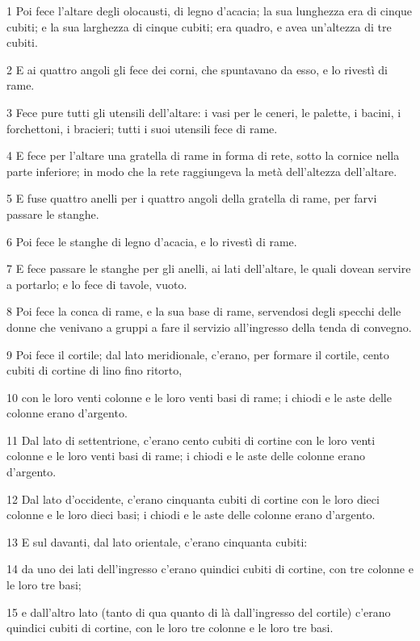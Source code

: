 \par 1 Poi fece l'altare degli olocausti, di legno d'acacia; la sua lunghezza era di cinque cubiti; e la sua larghezza di cinque cubiti; era quadro, e avea un'altezza di tre cubiti.
\par 2 E ai quattro angoli gli fece dei corni, che spuntavano da esso, e lo rivestì di rame.
\par 3 Fece pure tutti gli utensili dell'altare: i vasi per le ceneri, le palette, i bacini, i forchettoni, i bracieri; tutti i suoi utensili fece di rame.
\par 4 E fece per l'altare una gratella di rame in forma di rete, sotto la cornice nella parte inferiore; in modo che la rete raggiungeva la metà dell'altezza dell'altare.
\par 5 E fuse quattro anelli per i quattro angoli della gratella di rame, per farvi passare le stanghe.
\par 6 Poi fece le stanghe di legno d'acacia, e lo rivestì di rame.
\par 7 E fece passare le stanghe per gli anelli, ai lati dell'altare, le quali dovean servire a portarlo; e lo fece di tavole, vuoto.
\par 8 Poi fece la conca di rame, e la sua base di rame, servendosi degli specchi delle donne che venivano a gruppi a fare il servizio all'ingresso della tenda di convegno.
\par 9 Poi fece il cortile; dal lato meridionale, c'erano, per formare il cortile, cento cubiti di cortine di lino fino ritorto,
\par 10 con le loro venti colonne e le loro venti basi di rame; i chiodi e le aste delle colonne erano d'argento.
\par 11 Dal lato di settentrione, c'erano cento cubiti di cortine con le loro venti colonne e le loro venti basi di rame; i chiodi e le aste delle colonne erano d'argento.
\par 12 Dal lato d'occidente, c'erano cinquanta cubiti di cortine con le loro dieci colonne e le loro dieci basi; i chiodi e le aste delle colonne erano d'argento.
\par 13 E sul davanti, dal lato orientale, c'erano cinquanta cubiti:
\par 14 da uno dei lati dell'ingresso c'erano quindici cubiti di cortine, con tre colonne e le loro tre basi;
\par 15 e dall'altro lato (tanto di qua quanto di là dall'ingresso del cortile) c'erano quindici cubiti di cortine, con le loro tre colonne e le loro tre basi.
